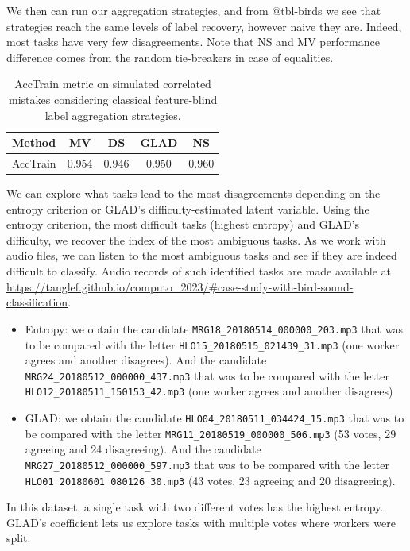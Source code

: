 We then can run our aggregation strategies, and from @tbl-birds we see that strategies reach the same levels of label recovery, however naive they are. Indeed, most tasks have very few disagreements.
Note that NS and MV performance difference comes from the random tie-breakers in case of equalities.

\begin{table}[htbp]
    \centering
    \caption{AccTrain metric on simulated correlated mistakes considering classical feature-blind label aggregation strategies.}
    \label{tab:accuracy_train_audiobirds}
    \begin{tabular}{|l|c|c|c|c|}
    \hline
    \textbf{Method} & \textbf{MV} & \textbf{DS} & \textbf{GLAD} & \textbf{NS} \\
    \hline
    AccTrain & 0.954 	&0.946 &	0.950& 	0.960\\
    \hline
    \end{tabular}
    \end{table}

We can explore what tasks lead to the most disagreements depending on the entropy criterion or GLAD's difficulty-estimated latent variable.
Using the entropy criterion, the most difficult tasks (highest entropy) and GLAD's difficulty, we recover the index of the most ambiguous tasks.
As we work with audio files, we can listen to the most ambiguous tasks and see if they are indeed difficult to classify.
Audio records of such identified tasks are made available at \url{https://tanglef.github.io/computo_2023/#case-study-with-bird-sound-classification}.

\begin{itemize}
    \item Entropy: we obtain the candidate \texttt{MRG18\_20180514\_000000\_203.mp3} that was to be compared with the letter \texttt{HLO15\_20180515\_021439\_31.mp3} (one worker agrees and another disagrees).
    And the candidate \texttt{MRG24\_20180512\_000000\_437.mp3} that was to be compared with the letter \texttt{HLO12\_20180511\_150153\_42.mp3} (one worker agrees and another disagrees)
    \item GLAD: we obtain the candidate \texttt{HLO04\_20180511\_034424\_15.mp3} that was to be compared with the letter \texttt{MRG11\_20180519\_000000\_506.mp3} (53 votes, 29 agreeing and 24 disagreeing). And the candidate \texttt{MRG27\_20180512\_000000\_597.mp3} that was to be compared with the letter \texttt{HLO01\_20180601\_080126\_30.mp3} (43 votes, 23 agreeing and 20 disagreeing).

\end{itemize}
In this dataset, a single task with two different votes has the highest entropy. GLAD's coefficient lets us explore tasks with multiple votes where workers were split.

